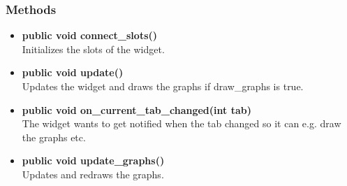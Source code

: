\subsubsection{Methods}
\begin{itemize}
  \item \textbf{public void connect\_slots()}\\
  Initializes the slots of the widget.
  \item \textbf{public void update()}\\
  Updates the widget and draws the graphs if draw\_graphs is true. 
  \item \textbf{public void on\_current\_tab\_changed(int tab)}\\
  The widget wants to get notified when the tab changed so it can e.g. draw the graphs etc.
  \item \textbf{public void update\_graphs()}\\
  Updates and redraws the graphs.
\end{itemize}

\newpage
